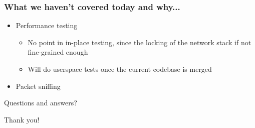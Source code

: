 \documentclass{beamer}
\begin{document}
\begin{frame}
\frametitle{What we haven't covered today and why...}
\begin{itemize}
	\item Performance testing
		\begin{itemize}
			\item No point in in-place testing, since the locking of the network stack if not fine-grained enough
			\item Will do userspace tests once the current codebase is merged
		\end{itemize}
	\item Packet sniffing
\end{itemize}
\end{frame}

\begin{frame}
\begin{center}
Questions and answers?
\end{center}
\end{frame}

\begin{frame}
\begin{center}
Thank you!
\end{center}
\end{frame}
\end{document}
